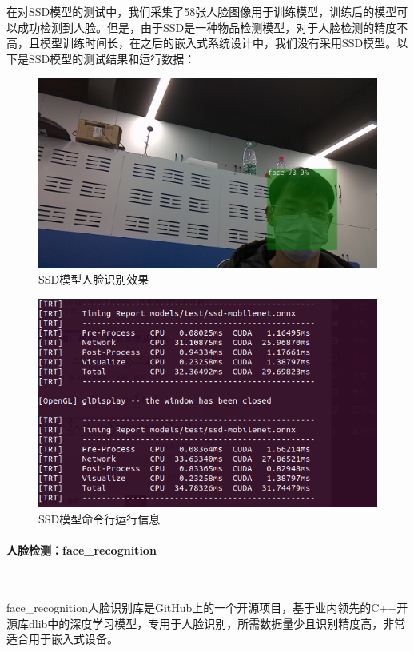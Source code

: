 \documentclass[UTF8]{article}
\begin{document}
在对SSD模型的测试中，我们采集了58张人脸图像用于训练模型，训练后的模型可以成功检测到人脸。但是，由于SSD是一种物品检测模型，对于人脸检测的精度不高，且模型训练时间长，在之后的嵌入式系统设计中，我们没有采用SSD模型。以下是SSD模型的测试结果和运行数据：
\begin{figure}[H]
    \centering %
    \includegraphics[width=.8\textwidth]{figure/ssd人脸识别效果.png} 
    \caption{SSD模型人脸识别效果} %
\end{figure}
\begin{figure}[H]
    \centering %
    \includegraphics[width=.8\textwidth]{figure/ssd模型命令行运行信息.png} 
    \caption{SSD模型命令行运行信息} %
\end{figure}

\paragraph{人脸检测：face\_recognition}~{}

face\_recognition人脸识别库是GitHub上的一个开源项目，基于业内领先的C++开源库dlib中的深度学习模型，专用于人脸识别，所需数据量少且识别精度高，非常适合用于嵌入式设备。
\end{document}
